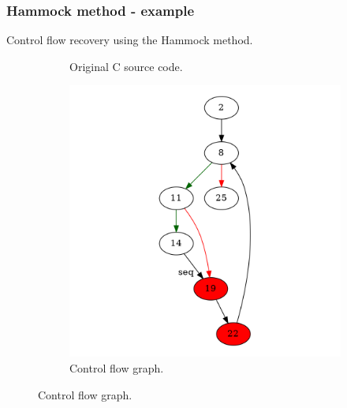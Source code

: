 \documentclass[aspectratio=1610]{beamer}
\begin{document}
\begin{frame}
	\frametitle{Hammock method - example}
	Control flow recovery using the Hammock method.
	\begin{figure}[htbp]
		\centering
		\begin{subfigure}[b]{0.30\textwidth}
			\centering
			
			\caption{Original C source code.}
		\end{subfigure}
		\begin{subfigure}[b]{0.50\textwidth}
			\centering
			\includegraphics[height=0.6\paperheight]{inc/methods/hammock/example/without-break/main_0001a.png}
			\caption{Control flow graph.}
		\end{subfigure}
	\end{figure}
\end{frame}
\end{document}
